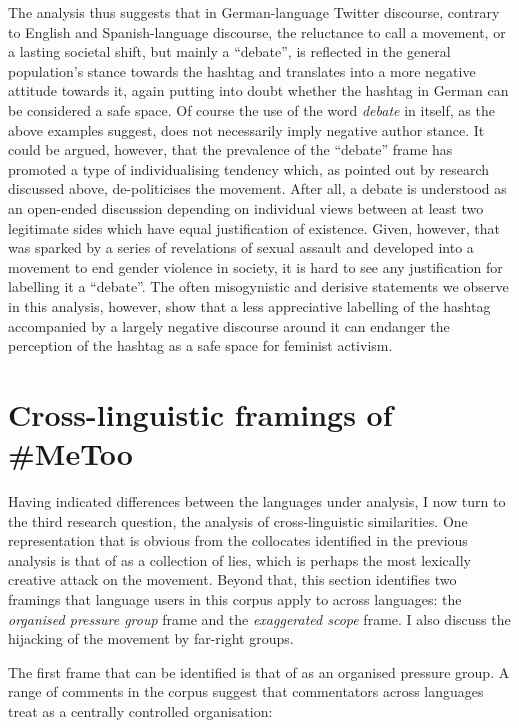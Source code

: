 \documentclass[output=paper,english,spanish,german,english]{langsci/langscibook}
\begin{document}
The analysis thus suggests that in German-language Twitter discourse, contrary to English and Spanish-language discourse, the reluctance to call \mt a movement, or a lasting societal shift, but mainly a \enquote{debate}, is reflected in the general population's stance towards the hashtag and translates into a more negative attitude towards it, again putting into doubt whether the hashtag in German can be considered a safe space. Of course the use of the word \textit{debate} in itself, as the above examples suggest, does not necessarily imply negative author stance. It could be argued, however, that the prevalence of the \enquote{debate} frame has promoted a type of individualising tendency which, as pointed out by research discussed above, de-politicises the \mt movement. After all, a debate is understood as an open-ended discussion depending on individual views between at least two legitimate sides which have equal justification of existence. Given, however, that \mt was sparked by a series of revelations of sexual assault and developed into a movement to end gender violence in society, it is hard to see any justification for labelling it a \enquote{debate}. The often misogynistic and derisive statements we observe in this analysis, however, show that a less appreciative labelling of the hashtag accompanied by a largely negative discourse around it can endanger the perception of the hashtag as a safe space for feminist activism.

\section{Cross-linguistic framings of \#MeToo}

Having indicated differences between the languages under analysis, I now turn to the third research question, the analysis of cross-linguistic similarities. One representation that is obvious from the collocates identified in the previous analysis is that of \mt as a collection of lies, which is perhaps the most lexically creative attack on the movement. Beyond that, this section identifies two framings that language users in this corpus apply to \mt across languages: the \textit{organised pressure group} frame and the \textit{exaggerated scope} frame. I also discuss the hijacking of the movement by far-right groups.

The first frame that can be identified is that of \mt as an organised pressure group. A range of comments in the corpus suggest that commentators across languages treat \mt as a centrally controlled organisation:
\end{document}
